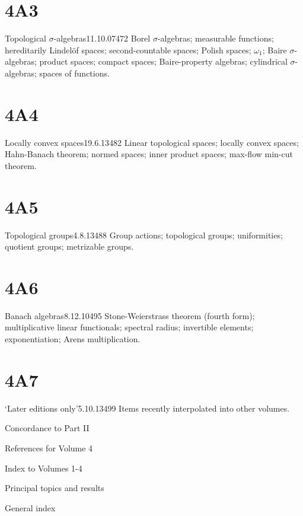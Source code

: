 \section{4A3}{Topological $\sigma$-algebras}{11.10.07}{472}{}
{Borel $\sigma$-algebras;  measurable functions;  hereditarily
Lindel\"of spaces;  second-countable spaces;  Polish spaces;
$\omega_1$;  Baire $\sigma$-algebras;  product spaces;  compact spaces;
Baire-property algebras;  cylindrical $\sigma$-algebras;  spaces of
\cadlag{} functions.}

\section{4A4}{Locally convex spaces}{19.6.13}{482}{}
{Linear topological spaces;  locally convex spaces;  Hahn-Banach
theorem;  normed spaces;  inner product spaces;  max-flow min-cut
theorem.}

\section{4A5}{Topological groups}{4.8.13}{488}{}
{Group actions;  topological groups;  uniformities;  quotient groups;
metrizable groups.}

\section{4A6}{Banach algebras}{8.12.10}{495}{}
{Stone-Weierstrass theorem (fourth form);  multiplicative linear
functionals;  spectral radius;  invertible elements;  exponentiation; 
Arens multiplication.}

\section{4A7}{`Later editions only'}{5.10.13}{499}{}
{Items recently interpolated into other volumes.}


Concordance to Part II 

\medskip

References for Volume 4 

\medskip

Index to Volumes 1-4

\qquad Principal topics and results 

\qquad General index 


